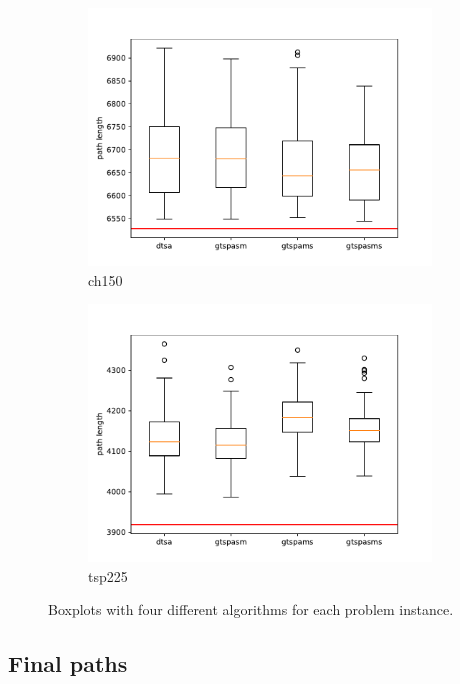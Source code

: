 \documentclass[12pt]{article}
\theoremstyle{plain}
\theoremstyle{definition}
\theoremstyle{remark}
\begin{document}
\begin{figure}[h]
\begin{subfigure}{.5\textwidth}
		\includegraphics[width=\textwidth]{../../Implementation/gen/boxplot_ch150}
		\caption{ch150}
	\end{subfigure}%
	\begin{subfigure}{.5\textwidth}
		\centering
		\includegraphics[width=\textwidth]{../../Implementation/gen/boxplot_tsp225}
		\caption{tsp225}
	\end{subfigure}
	\caption{Boxplots with four different algorithms for each problem instance.}
	\label{fig:boxplots}
\end{figure}

\subsection{Final paths}
\label{sec:final_paths}
\end{document}

